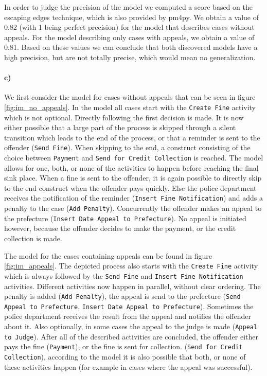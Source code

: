 \documentclass[12pt]{report}
\begin{document}
In order to judge the precision of the model we computed a score based on the escaping edges technique, which is also provided by pm4py. We obtain a value of 0.82 (with 1 being perfect precision) for the model that describes cases without appeals. For the model describing only cases with appeals, we obtain a value of 0.81. Based on these values we can conclude that both discovered models have a high precision, but are not totally precise, which would mean no generalization.

\paragraph{\textbf{c)}}

We first consider the model for cases without appeals that can be seen in figure \ref{fig:im_no_appeals}. In the model all cases start with the \texttt{Create Fine} activity which is not optional. Directly following the first decision is made. It is now either possible that a large part of the process is skipped through a silent transition which leads to the end of the process, or that a reminder is sent to the offender (\texttt{Send Fine}). When skipping to the end, a construct consisting of the choice between \texttt{Payment} and \texttt{Send for Credit Collection} is reached. The model allows for one, both, or none of the activities to happen before reaching the final sink place. When a fine is sent to the offender, it is again possible to directly skip to the end construct when the offender pays quickly. Else the police department receives the notification of the reminder (\texttt{Insert Fine Notification}) and adds a penalty to the case (\texttt{Add Penalty}). Concurrently the offender makes an appeal to the prefecture (\texttt{Insert Date Appeal to Prefecture}). No appeal is initiated however, because the offender decides to make the payment, or the credit collection is made.

The model for the cases containing appeals can be found in figure \ref{fig:im_appeals}. The depicted process also starts with the \texttt{Create Fine} activity which is always followed by the \texttt{Send Fine} and \texttt{Insert Fine Notification} activities. Different activities now happen in parallel, without clear ordering. The penalty is added (\texttt{Add Penalty}), the appeal is send to the prefecture (\texttt{Send Appeal to Prefecture}, \texttt{Insert Date Appeal to Prefecture}). Sometimes the police department receives the result from the appeal and notifies the offender about it. Also optionally, in some cases the appeal to the judge is made (\texttt{Appeal to Judge}). After all of the described activities are concluded, the offender either pays the fine (\texttt{Payment}), or the fine is sent for collection. (\texttt{Send for Credit Collection}), according to the model it is also possible that both, or none of these activities happen (for example in cases where the appeal was successful).
\end{document}

